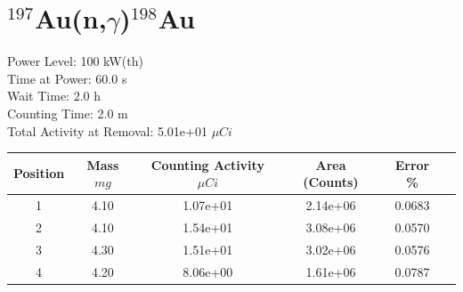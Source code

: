 \newpage

\section*{ $^{197}$Au(n,$\gamma$)$^{198}$Au }

Power Level: 100 kW(th) \\
Time at Power: 60.0 s \\
Wait Time:  2.0 h \\
Counting Time:  2.0 m \\
Total Activity at Removal: 5.01e+01 $\mu Ci$

\begin{table}[h]
\centering
\begin{tabular}{ |c|c|c|c|c|c| }
 \hline
 Position & Mass $mg$ & Counting Activity $\mu Ci$ & Area (Counts) & Error \% \\
 \hline 
 1 & 4.10 & 1.07e+01 & 2.14e+06 & 0.0683 \\ 
\hline
 2 & 4.10 & 1.54e+01 & 3.08e+06 & 0.0570 \\ 
\hline
 3 & 4.30 & 1.51e+01 & 3.02e+06 & 0.0576 \\ 
\hline
 4 & 4.20 & 8.06e+00 & 1.61e+06 & 0.0787 \\ 
\hline
\end{tabular}
\end{table}

